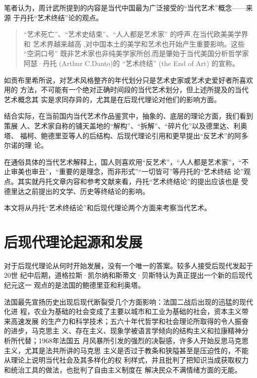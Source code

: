 笔者认为，周计武所提到的内容是当代中国最为广泛接受的“当代艺术”概念——来源
于丹托“艺术终结”论的观点。
\begin{quotation}
  “艺术死亡”、“艺术史结束”、“人人都是艺术家” 的呼声,在当代欧美美学界和
  艺术界越来越高 ,对中国本土的美学和艺术也开始产生重要影响。这些 “空洞口号”
  既非艺术家也非纯美学家所创,而是肇始于当代美国分析哲学家阿瑟·丹托 (Arthur
  C.Danto)的 “艺术终结” (the End of Art) 的宣称。\cite{boduoyishu}
\end{quotation}

如贡布里希所说，对艺术风格整齐的年代划分只是艺术史家或艺术史爱好者所喜欢用的
方法，不可能有一个绝对正确时间段的当代艺术划分，但上述所提及的当代艺术概念其
实是求同存异的，尤其是在后现代理论对他们的影响方面。

结合实际，在当前国内当代艺术作品鉴赏中，抽象的、底层的理论方面，我们看到策展
人、艺术家自称的铺天盖地的“解构”、“拆解”、“碎片化”以及德里达、利奥塔、
福柯、鲍德里亚等人的后结构、后现代理论引用和更早提出“反艺术”的阿多尔诺的理
论。

在通俗具体的当代艺术解释上，国人则喜欢用“反艺术”，“人人都是艺术家”，“不
止审美也审丑”，“重要的是理念，而非形式”“一切皆可”等丹托的“艺术终结
论”观点。其实就丹托文章内容和参考文献来看，丹托“艺术终结论”的提出应该也是
受德里达之前提出的文学、历史等终结论的影响。

本文将从丹托“艺术终结论”和后现代理论两个方面来考察当代艺术。

\section{后现代理论起源和发展} 


对于后现代理论从何时开始发展，没有一个唯一的答案。较多人接受后现代发起于20世
纪中后期，道格拉斯·凯尔纳和斯蒂文·贝斯特认为真正提出一个新的后现代纪元这一
观点的是法国的鲍德里亚和利奥塔。

法国最先宣扬历史出现后现代断裂受几个方面影响：法国二战后出现的迅猛的现代化进
程，农业为基础的社会变成了主要以城市和工业为基础的社会，资本主义带来高速发展
的生产力和科学技术；五六十年代哲学和社会理论所取得的令人振奋的进步，马克思主
义、存在主义、现象学被语言学倾向的结构主义和拉康精神分析所代替；1968年法国五
月风暴所引发的强烈的决裂感，许多人开始反思马克思主义，尤其是法共所讲的马克思
主义是否过于教条和狭隘甚至是压迫性的，不能从理论上说明当代社会及其多样化的权
利样式，并且批判了把知识当成获取权力和统治工具的做法，也批判了自由主义制度在
解决民众不满情绪方面的无能。

